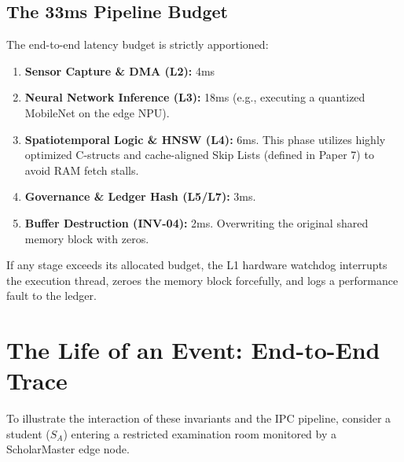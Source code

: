 \documentclass[conference]{IEEEtran}
\theoremstyle{definition}
\begin{document}
\subsection{The 33ms Pipeline Budget}
The end-to-end latency budget is strictly apportioned:
\begin{enumerate}
    \item \textbf{Sensor Capture \& DMA (L2):} 4ms
    \item \textbf{Neural Network Inference (L3):} 18ms (e.g., executing a quantized MobileNet on the edge NPU).
    \item \textbf{Spatiotemporal Logic \& HNSW (L4):} 6ms. This phase utilizes highly optimized C-structs and cache-aligned Skip Lists (defined in Paper 7) to avoid RAM fetch stalls.
    \item \textbf{Governance \& Ledger Hash (L5/L7):} 3ms.
    \item \textbf{Buffer Destruction (INV-04):} 2ms. Overwriting the original shared memory block with zeros.
\end{enumerate}
If any stage exceeds its allocated budget, the L1 hardware watchdog interrupts the execution thread, zeroes the memory block forcefully, and logs a performance fault to the ledger.

\section{The Life of an Event: End-to-End Trace}
To illustrate the interaction of these invariants and the IPC pipeline, consider a student ($S_A$) entering a restricted examination room monitored by a ScholarMaster edge node.
\end{document}
